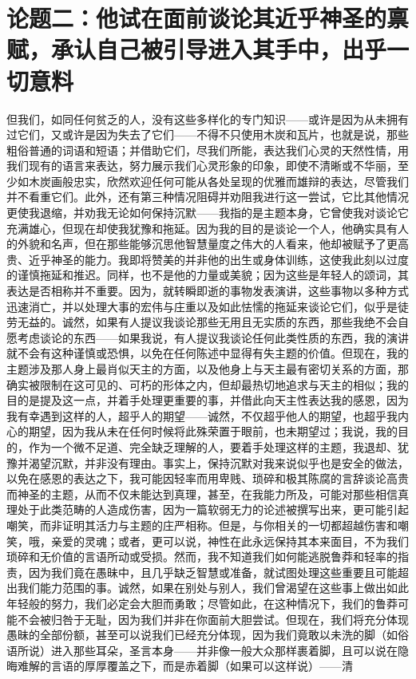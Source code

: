 
\section{论题二：他试在面前谈论其近乎神圣的禀赋，承认自己被引导进入其手中，出乎一切意料}

但我们，如同任何贫乏的人，没有这些多样化的专门知识——或许是因为从未拥有过它们，又或许是因为失去了它们——不得不只使用木炭和瓦片，也就是说，那些粗俗普通的词语和短语；并借助它们，尽我们所能，表达我们心灵的天然性情，用我们现有的语言来表达，努力展示我们心灵形象的印象，即使不清晰或不华丽，至少如木炭画般忠实，欣然欢迎任何可能从各处呈现的优雅而雄辩的表达，尽管我们并不看重它们。此外，还有第三种情况阻碍并劝阻我进行这一尝试，它比其他情况更使我退缩，并劝我无论如何保持沉默——我指的是主题本身，它曾使我对谈论它充满雄心，但现在却使我犹豫和拖延。因为我的目的是谈论一个人，他确实具有人的外貌和名声，但在那些能够沉思他智慧量度之伟大的人看来，他却被赋予了更高贵、近乎神圣的能力。我即将赞美的并非他的出生或身体训练，这使我此刻以过度的谨慎拖延和推迟。同样，也不是他的力量或美貌；因为这些是年轻人的颂词，其表达是否相称并不重要。因为，就转瞬即逝的事物发表演讲，这些事物以多种方式迅速消亡，并以处理大事的宏伟与庄重以及如此怯懦的拖延来谈论它们，似乎是徒劳无益的。诚然，如果有人提议我谈论那些无用且无实质的东西，那些我绝不会自愿考虑谈论的东西——如果我说，有人提议我谈论任何此类性质的东西，我的演讲就不会有这种谨慎或恐惧，以免在任何陈述中显得有失主题的价值。但现在，我的主题涉及那人身上最肖似天主的方面，以及他身上与天主最有密切关系的方面，那确实被限制在这可见的、可朽的形体之内，但却最热切地追求与天主的相似；我的目的是提及这一点，并着手处理更重要的事，并借此向天主性表达我的感恩，因为我有幸遇到这样的人，超乎人的期望——诚然，不仅超乎他人的期望，也超乎我内心的期望，因为我从未在任何时候将此殊荣置于眼前，也未期望过；我说，我的目的，作为一个微不足道、完全缺乏理解的人，要着手处理这样的主题，我退却、犹豫并渴望沉默，并非没有理由。事实上，保持沉默对我来说似乎也是安全的做法，以免在感恩的表达之下，我可能因轻率而用卑贱、琐碎和极其陈腐的言辞谈论高贵而神圣的主题，从而不仅未能达到真理，甚至，在我能力所及，可能对那些相信真理处于此类范畴的人造成伤害，因为一篇软弱无力的论述被撰写出来，更可能引起嘲笑，而非证明其活力与主题的庄严相称。但是，与你相关的一切都超越伤害和嘲笑，哦，亲爱的灵魂；或者，更可以说，神性在此永远保持其本来面目，不为我们琐碎和无价值的言语所动或受损。然而，我不知道我们如何能逃脱鲁莽和轻率的指责，因为我们竟在愚昧中，且几乎缺乏智慧或准备，就试图处理这些重要且可能超出我们能力范围的事。诚然，如果在别处与别人，我们曾渴望在这些事上做出如此年轻般的努力，我们必定会大胆而勇敢；尽管如此，在这种情况下，我们的鲁莽可能不会被归咎于无耻，因为我们并非在你面前大胆尝试。但现在，我们将充分体现愚昧的全部份额，甚至可以说我们已经充分体现，因为我们竟敢以未洗的脚（如俗语所说）进入那些耳朵，圣言本身——并非像一般大众那样裹着脚，且可以说在隐晦难解的言语的厚厚覆盖之下，而是赤着脚（如果可以这样说）——清